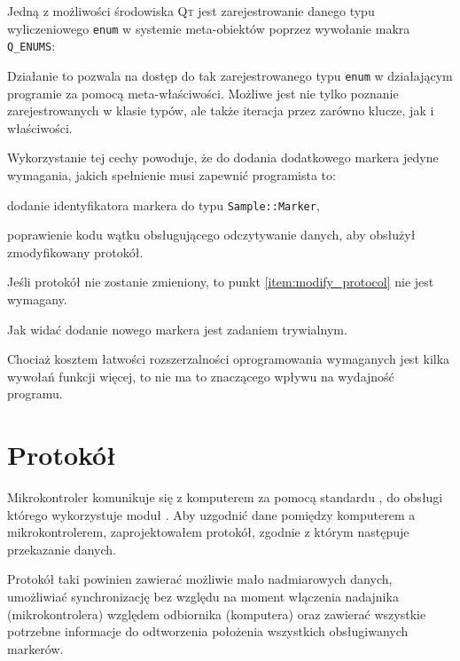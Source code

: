 Jedną z możliwości środowiska \textsc{Qt} jest zarejestrowanie danego typu wyliczeniowego \verb|enum| w systemie meta-obiektów poprzez wywołanie makra \verb|Q_ENUMS|:
\begin{verbatimtab}
class Sample : public QObject
{
	Q_OBJECT;
	Q_ENUMS(Marker);
public:
	enum Marker {Blue = 1, Yellow = 2};
	(...)
\end{verbatimtab}

Działanie to pozwala na dostęp do tak zarejestrowanego typu \verb|enum| w działającym programie za pomocą meta-właściwości. Możliwe jest nie tylko poznanie zarejestrowanych w klasie typów, ale także iteracja przez zarówno klucze, jak i właściwości.

Wykorzystanie tej cechy powoduje, że do dodania dodatkowego markera jedyne wymagania, jakich spełnienie musi zapewnić programista to:
\begin{aenumerate}
  \item dodanie identyfikatora markera do typu \verb|Sample::Marker|,
  \item poprawienie kodu wątku obsługującego odczytywanie danych, aby obsłużył zmodyfikowany protokół.\label{item:modify_protocol}
\end{aenumerate}

Jeśli protokół nie zostanie zmieniony, to punkt \ref{item:modify_protocol} nie jest wymagany.

Jak widać dodanie nowego markera jest zadaniem trywialnym.

Chociaż kosztem łatwości rozszerzalności oprogramowania wymaganych jest kilka wywołań funkcji więcej, to nie ma to znaczącego wpływu na wydajność programu.

\section{Protokół}
\label{sec:protocol}
Mikrokontroler komunikuje się z komputerem za pomocą standardu , do obsługi którego wykorzystuje moduł . Aby uzgodnić dane pomiędzy komputerem a mikrokontrolerem, zaprojektowałem protokół, zgodnie z którym następuje przekazanie danych.

Protokół taki powinien zawierać możliwie mało nadmiarowych danych, umożliwiać synchronizację bez względu na moment włączenia nadajnika (mikrokontrolera) względem odbiornika (komputera) oraz zawierać wszystkie potrzebne informacje do odtworzenia położenia wszystkich obsługiwanych markerów.

